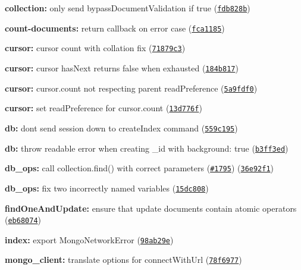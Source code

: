 \begin{DoxyItemize}
\item {\bfseries collection\+:} only send bypass\+Document\+Validation if true (\href{https://github.com/mongodb/node-mongodb-native/commit/fdb828b}{\tt fdb828b})
\item {\bfseries count-\/documents\+:} return callback on error case (\href{https://github.com/mongodb/node-mongodb-native/commit/fca1185}{\tt fca1185})
\item {\bfseries cursor\+:} cursor count with collation fix (\href{https://github.com/mongodb/node-mongodb-native/commit/71879c3}{\tt 71879c3})
\item {\bfseries cursor\+:} cursor has\+Next returns false when exhausted (\href{https://github.com/mongodb/node-mongodb-native/commit/184b817}{\tt 184b817})
\item {\bfseries cursor\+:} cursor.\+count not respecting parent read\+Preference (\href{https://github.com/mongodb/node-mongodb-native/commit/5a9fdf0}{\tt 5a9fdf0})
\item {\bfseries cursor\+:} set read\+Preference for cursor.\+count (\href{https://github.com/mongodb/node-mongodb-native/commit/13d776f}{\tt 13d776f})
\item {\bfseries db\+:} don\textquotesingle{}t send session down to create\+Index command (\href{https://github.com/mongodb/node-mongodb-native/commit/559c195}{\tt 559c195})
\item {\bfseries db\+:} throw readable error when creating {\ttfamily \+\_\+id} with background\+: true (\href{https://github.com/mongodb/node-mongodb-native/commit/b3ff3ed}{\tt b3ff3ed})
\item {\bfseries db\+\_\+ops\+:} call collection.\+find() with correct parameters (\href{https://github.com/mongodb/node-mongodb-native/issues/1795}{\tt \#1795}) (\href{https://github.com/mongodb/node-mongodb-native/commit/36e92f1}{\tt 36e92f1})
\item {\bfseries db\+\_\+ops\+:} fix two incorrectly named variables (\href{https://github.com/mongodb/node-mongodb-native/commit/15dc808}{\tt 15dc808})
\item {\bfseries find\+One\+And\+Update\+:} ensure that update documents contain atomic operators (\href{https://github.com/mongodb/node-mongodb-native/commit/eb68074}{\tt eb68074})
\item {\bfseries index\+:} export Mongo\+Network\+Error (\href{https://github.com/mongodb/node-mongodb-native/commit/98ab29e}{\tt 98ab29e})
\item {\bfseries mongo\+\_\+client\+:} translate options for connect\+With\+Url (\href{https://github.com/mongodb/node-mongodb-native/commit/78f6977}{\tt 78f6977})

\end{DoxyItemize}
